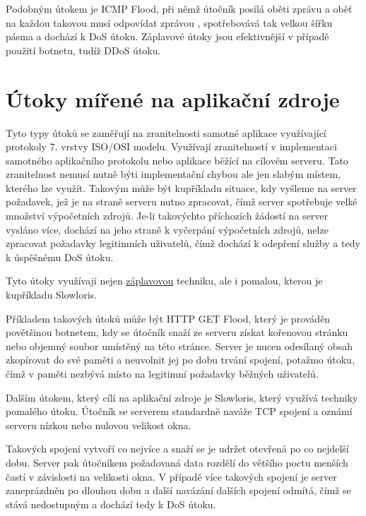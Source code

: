 Podobným útokem je ICMP Flood, při němž útočník posílá oběti zprávu  a oběť
na každou takovou musí odpovídat zprávou , spotřebovává tak velkou šířku
pásma a dochází k DoS útoku.
Záplavové útoky jsou efektivnější v případě použití botnetu, tudíž DDoS útoku.


\section{Útoky mířené na aplikační zdroje}
\label{sec:utoky_na_aplikacni_zdroje}
Tyto typy útoků se zaměřují na zranitelnosti samotné aplikace využívající protokoly 
7. vrstvy ISO/OSI modelu. Využívají zranitelností v implementaci samotného aplikačního
protokolu nebo aplikace běžící na cílovém serveru. Tato zranitelnost nemusí nutně býti
implementační chybou ale jen slabým místem, kterého lze využít. Takovým může být kupříkladu
situace, kdy vyšleme na server požadavek, jež je na straně serveru nutno zpracovat, čímž
server spotřebuje velké množství výpočetních zdrojů. Je-li takovýchto příchozích žádostí na
server vysláno více, dochází na jeho straně k vyčerpání výpočetních zdrojů, nelze zpracovat
požadavky legitimních uživatelů, čímž dochází k odepření služby a tedy k úspěšnému DoS útoku.

Tyto útoky využívají nejen \hyperref[subs_zaplavove]{záplavovou} techniku, ale i pomalou, kterou je
kupříkladu Slowloris.
 
Příkladem takových útoků může být HTTP GET Flood, který je prováděn povětšinou botnetem, kdy
se útočník snaží ze serveru získat kořenovou stránku nebo objemný soubor umístěný na této
stránce. Server je nucen odesílaný obsah zkopírovat do své paměti a neuvolnit jej po dobu
trvání spojení, potažmo útoku, čímž v paměti nezbývá místo na legitimní požadavky běžných
uživatelů.

Dalším útokem, který cílí na aplikační zdroje je Slowloris, který využívá techniky pomalého
útoku. Útočník se serverem standardně naváže TCP spojení a oznámí serveru nízkou nebo nulovou
velikost okna.

Takových spojení vytvoří co nejvíce a snaží se je udržet otevřená po co nejdelší dobu.
Server pak útočníkem požadovaná data rozdělí do většího poctu menších častí v závislosti na
velikosti okna. V případě více takových spojení je server zaneprázdněn po dlouhou dobu a
další navázání dalších spojení odmítá, čímž se stává nedostupným a dochází tedy k DoS
útoku.

